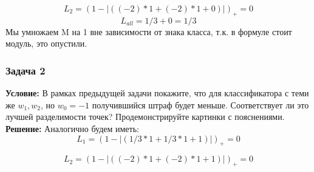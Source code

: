 \[
    L_2 = (1 - |((-2)*1 + (-2)*1 + 0)|)_+ = 0
\]
\[
    L_{all} = 1/3 + 0 = 1/3
\]
Мы умножаем M на 1 вне зависимости от знака класса, т.к. в формуле стоит модуль, это опустили.
\subsubsection*{Задача 2}
\textbf{Условие:}
В рамках предыдущей задачи покажите, что для классификатора с теми же $w_1, w_2$, но $w_0 = -1$ получившийся штраф будет меньше. Соответствует ли это лучшей разделимости точек? Продемонстрируйте картинки с пояснениями.\\
\textbf{Решение:}
Аналогично будем иметь:
\[  
    L_1 = (1 - |(1/3*1 + 1/3*1 + 1)|)_+ = 0
\]

\[
    L_2 = (1 - |((-2)*1 + (-2)*1 + 1)|)_+ = 0
\]

